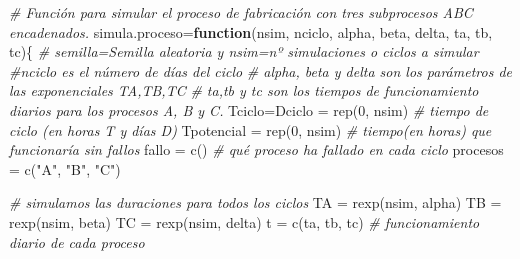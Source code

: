 \documentclass[
]{book}
\newenvironment{Shaded}{\begin{snugshade}}{\end{snugshade}}
\newcommand{\CommentTok}[1]{\textcolor[rgb]{0.56,0.35,0.01}{\textit{#1}}}
\newcommand{\ControlFlowTok}[1]{\textcolor[rgb]{0.13,0.29,0.53}{\textbf{#1}}}
\newcommand{\DecValTok}[1]{\textcolor[rgb]{0.00,0.00,0.81}{#1}}
\newcommand{\FunctionTok}[1]{\textcolor[rgb]{0.00,0.00,0.00}{#1}}
\newcommand{\NormalTok}[1]{#1}
\newcommand{\OtherTok}[1]{\textcolor[rgb]{0.56,0.35,0.01}{#1}}
\newcommand{\StringTok}[1]{\textcolor[rgb]{0.31,0.60,0.02}{#1}}
\theoremstyle{definition}
\theoremstyle{definition}
\theoremstyle{definition}
\theoremstyle{definition}
\theoremstyle{remark}
\begin{document}
\begin{Shaded}
\begin{Highlighting}[]
\CommentTok{\# Función para simular el proceso de fabricación con tres subprocesos ABC encadenados.}
\NormalTok{simula.proceso}\OtherTok{=}\ControlFlowTok{function}\NormalTok{(nsim, nciclo, alpha, beta, delta, ta, tb, tc)\{}
\CommentTok{\# semilla=Semilla aleatoria y nsim=nº simulaciones o ciclos a simular}
\CommentTok{\#nciclo es el número de días del ciclo}
\CommentTok{\# alpha, beta y delta son los parámetros de las exponenciales TA,TB,TC}
\CommentTok{\# ta,tb y tc son los tiempos de funcionamiento diarios para los procesos A, B y C.}
\NormalTok{Tciclo}\OtherTok{=}\NormalTok{Dciclo }\OtherTok{=} \FunctionTok{rep}\NormalTok{(}\DecValTok{0}\NormalTok{, nsim)   }\CommentTok{\# tiempo de ciclo (en horas T y días D)}
\NormalTok{Tpotencial }\OtherTok{=} \FunctionTok{rep}\NormalTok{(}\DecValTok{0}\NormalTok{, nsim)      }\CommentTok{\# tiempo(en horas) que funcionaría sin fallos}
\NormalTok{fallo }\OtherTok{=} \FunctionTok{c}\NormalTok{()                   }\CommentTok{\# qué proceso ha fallado en cada ciclo}
\NormalTok{procesos }\OtherTok{=} \FunctionTok{c}\NormalTok{(}\StringTok{"A"}\NormalTok{, }\StringTok{"B"}\NormalTok{, }\StringTok{"C"}\NormalTok{)}

\CommentTok{\# simulamos las duraciones para todos los ciclos}
\NormalTok{TA }\OtherTok{=} \FunctionTok{rexp}\NormalTok{(nsim, alpha)  }
\NormalTok{TB }\OtherTok{=} \FunctionTok{rexp}\NormalTok{(nsim, beta)}
\NormalTok{TC }\OtherTok{=} \FunctionTok{rexp}\NormalTok{(nsim, delta)}
\NormalTok{t }\OtherTok{=} \FunctionTok{c}\NormalTok{(ta, tb, tc) }\CommentTok{\# funcionamiento diario de cada proceso}


\end{Highlighting}
\end{Shaded}
\end{document}
